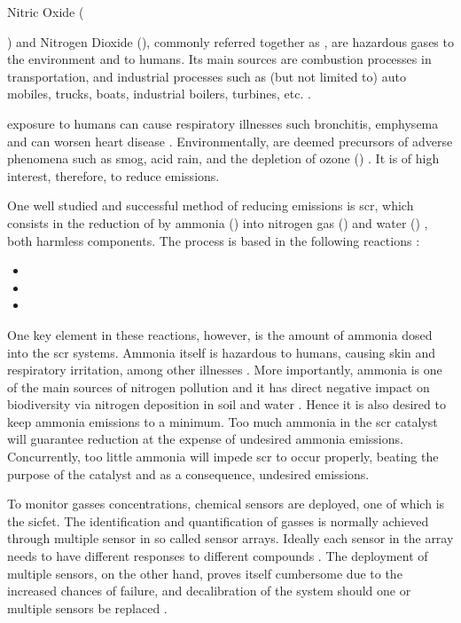 Nitric Oxide ({) and Nitrogen Dioxide (), commonly referred together as \nox,  are hazardous gases to the environment and to humans. Its main sources are combustion processes in transportation, and industrial processes such as (but not limited to) auto mobiles, trucks, boats, industrial boilers, turbines, etc. \parencite{EPA_2019}.

\nox exposure to humans can cause respiratory illnesses such bronchitis, emphysema and can worsen heart disease \parencite{Boningari_2016}. Environmentally, \nox are deemed precursors of adverse phenomena such as smog, acid rain, and the depletion of ozone () \parencite{Bernabeo_2019}. It is of high interest, therefore, to reduce \nox emissions.

One well studied and successful method of reducing emissions is \acrfull{scr}, which consists in the reduction of \nox by ammonia () into nitrogen gas () and water () \parencite{Forzatti_2001}, both harmless components. The process is based in the following reactions \parencite{Forzatti_2001}:
\begin{itemize}
	\item {}
	
	\item {}
	
	\item {}
\end{itemize}


One key element in these reactions, however, is the amount of ammonia dosed into the \acrshort{scr} systems. Ammonia itself is hazardous to humans, causing skin and respiratory irritation, among other illnesses \parencite{ASTDRA_2004}. More importantly, ammonia is one of the main sources of nitrogen pollution and it has direct negative impact on biodiversity via nitrogen deposition in soil and water \parencite{RAND_2018}. Hence it is also desired to keep ammonia emissions to a minimum. Too much ammonia in the \acrshort{scr} catalyst will guarantee \nox reduction at the expense of undesired ammonia emissions. Concurrently, too little ammonia will impede \acrshort{scr} to occur properly, beating the purpose of the catalyst and as a consequence, undesired \nox emissions.

To monitor gasses concentrations, chemical sensors are deployed, one of which is the \acrfull{sicfet}. The identification and quantification of gasses is normally achieved through multiple sensor in so called sensor arrays. Ideally each sensor in the array needs to have different responses to different compounds \parencite{Bastuck_2019}. The deployment of multiple sensors, on the other hand, proves itself cumbersome due to the increased chances of failure, and decalibration of the system should one or multiple sensors be replaced \parencite{Bastuck_2019}.

}
